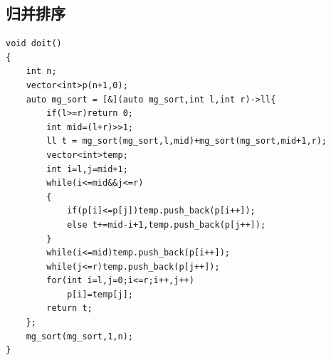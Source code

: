 \documentclass[12pt, a4paper, oneside]{ctexart}
\begin{document}
\newpage
\subsection{归并排序} 
\begin{lstlisting}
void doit()
{
	int n;
	vector<int>p(n+1,0);
	auto mg_sort = [&](auto mg_sort,int l,int r)->ll{
		if(l>=r)return 0;
		int mid=(l+r)>>1;
		ll t = mg_sort(mg_sort,l,mid)+mg_sort(mg_sort,mid+1,r);
		vector<int>temp;
		int i=l,j=mid+1;
		while(i<=mid&&j<=r)
		{
			if(p[i]<=p[j])temp.push_back(p[i++]);
			else t+=mid-i+1,temp.push_back(p[j++]);
		}
		while(i<=mid)temp.push_back(p[i++]);
		while(j<=r)temp.push_back(p[j++]);
		for(int i=l,j=0;i<=r;i++,j++)
			p[i]=temp[j];
		return t;
	};
	mg_sort(mg_sort,1,n);
}
\end{lstlisting}





\newpage
\end{document}
